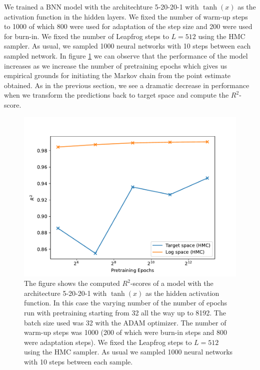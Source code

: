 We trained a BNN model with the architechture 5-20-20-1 with $\tanh(x)$ as the activation function in the hidden layers. We fixed the number of warm-up steps to 1000 of which 800 were used for adaptation of the step size and 200 were used for burn-in. We fixed the number of Leapfrog steps to $L = 512$ using the HMC sampler. As usual, we sampled 1000 neural networks with 10 steps between each sampled network. In figure \ref{fig:r2_score_vs_pretraining} we can observe that the performance of the model increases as we increase the number of pretraining epochs which gives us empirical grounds for initiating the Markov chain from the point estimate obtained. As in the previous section, we see a dramatic decrease in performance when we transform the predictions back to target space and compute the $R^2$-score. 
\begin{figure}[H]
    \centering
    \includegraphics[scale=0.7]{figures/r2_scores/r2_score_vs_pretraining.pdf}
    \caption{The figure shows the computed $R^2$-scores of a model with the architecture 5-20-20-1 with $\tanh(x)$ as the
    hidden activation function. In this case the varying number of the number of epochs run with pretraining starting from 32 all the way up to 8192. The batch size used was 32 with the ADAM optimizer. The number of warm-up steps was 1000 (200 of which were burn-in steps and 800 were adaptation steps). We fixed the Leapfrog steps to $L = 512$ using the HMC sampler. As usual we sampled 1000 neural networks with 10 steps between each sample.
    }
    \label{fig:r2_score_vs_pretraining}
\end{figure}

